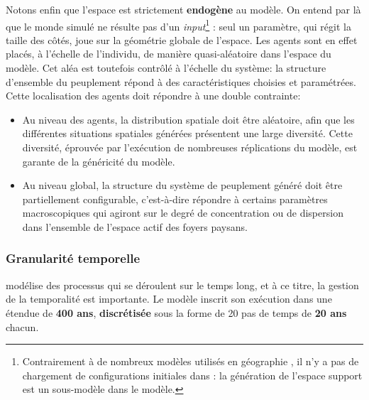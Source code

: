 \clearpage


Notons enfin que l'espace est strictement \textbf{endogène} au modèle.
On entend par là que le monde simulé ne résulte pas d'un \textit{input}\footnote{
	Contrairement à de nombreux modèles utilisés en géographie \autocites[etc.]{white_use_1997,white_high-resolution_2000,dubos-paillard_analyse_2003,benenson_schelling_2009}, il n'y a pas de chargement de configurations initiales dans \simfeodal{} : la génération de l'espace support est un sous-modèle dans le modèle.
} : seul un paramètre, qui régit la taille des côtés, joue sur la géométrie globale de l'espace.
Les agents sont en effet placés, à l'échelle de l'individu, de manière quasi-aléatoire dans l'espace du modèle.
Cet aléa est toutefois contrôlé à l'échelle du système: la structure d'ensemble du peuplement répond à des caractéristiques choisies et paramétrées.
Cette localisation des agents doit répondre à une double contrainte:
\begin{itemize}
	\item Au niveau des agents, la distribution spatiale doit être aléatoire, afin que les différentes situations spatiales générées présentent une large diversité.
	Cette diversité, éprouvée par l'exécution de nombreuses réplications du modèle, est garante de la généricité du modèle.
	\item Au niveau global, la structure du système de peuplement généré doit être partiellement configurable, c'est-à-dire répondre à certains paramètres macroscopiques qui agiront sur le degré de concentration ou de dispersion dans l'ensemble de l'espace \og actif\fg{} des foyers paysans.
\end{itemize}


\subsubsection{Granularité temporelle \label{sssec:granularite-temporelle}}

\simfeodal{} modélise des processus qui se déroulent sur le temps long, et à ce titre, la gestion de la temporalité est importante.
Le modèle inscrit son exécution dans une étendue de \textbf{400 ans}, \textbf{discrétisée} sous la forme de 20 pas de temps de \textbf{20 ans} chacun.

